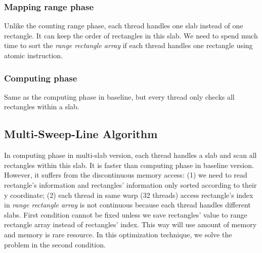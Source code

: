 \subsubsection{Mapping range phase}
Unlike the counting range phase, each thread handles one slab instead of one rectangle. It can keep the order of rectangles in this slab. We need to spend much time to sort the \textit{range rectangle array} if each thread handles one rectangle using atomic instruction.

\subsubsection{Computing phase}
Same as the computing phase in baseline, but every thread only checks all rectangles within a slab.

\subsection{Multi-Sweep-Line Algorithm}
In computing phase in multi-slab version, each thread handles a slab and scan all rectangles within this slab. It is faster than computing phase in baseline version. However, it suffers from the discontinuous memory access: (1) we need to read rectangle's information and rectangles' information only sorted according to their y coordinate; (2) each thread in same warp (32 threads) access rectangle's index in \textit{range rectangle array} is not continuous because each thread handles different slabs. First condition cannot be fixed unless we save rectangles' value to range rectangle array instead of rectangles' index. This way will use amount of memory and memory is rare resource. In this optimization technique, we solve the problem in the second condition.

